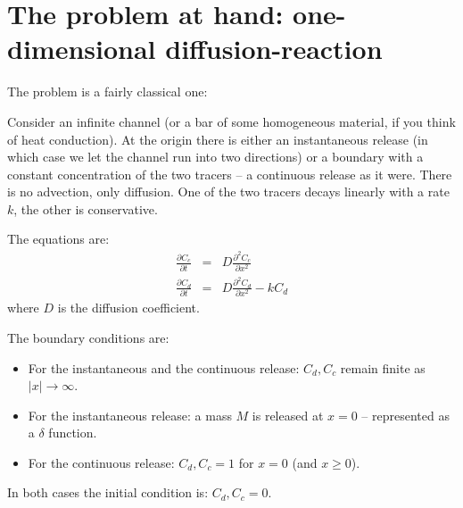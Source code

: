 \documentclass[onecolumn]{article}
\begin{document}
%

\section*{The problem at hand: one-dimensional diffusion-reaction}
The problem is a fairly classical one:

Consider an infinite channel (or a bar of some homogeneous material, if you think of heat conduction). At the origin there is either an instantaneous
release (in which case we let the channel run into two directions) or a boundary with a constant concentration of the
two tracers -- a continuous release as it were. There is no advection, only diffusion. One of the two tracers decays linearly with a rate $k$, the
other is conservative.

The equations are:
\begin{eqnarray}
\label{transport1}
    \frac{\partial C_c}{\partial t} &=& D \frac{\partial^2 C_c}{\partial x^2} \\
\label{transport2}
    \frac{\partial C_d}{\partial t} &=& D \frac{\partial^2 C_d}{\partial x^2} - k C_d
\end{eqnarray}
%
\noindent where $D$ is the diffusion coefficient.

The boundary conditions are:
\begin{itemize}
\item
For the instantaneous and the continuous release: $C_d, C_c$ remain finite as $|x| \rightarrow \infty$.
\item
For the instantaneous release: a mass $M$ is released at $x = 0$ -- represented as a $\delta$ function.
\item
For the continuous release: $C_d, C_c = 1$ for $x = 0$ (and $x \geq 0$).
\end{itemize}
In both cases the initial condition is: $C_d, C_c = 0$.
\end{document}
